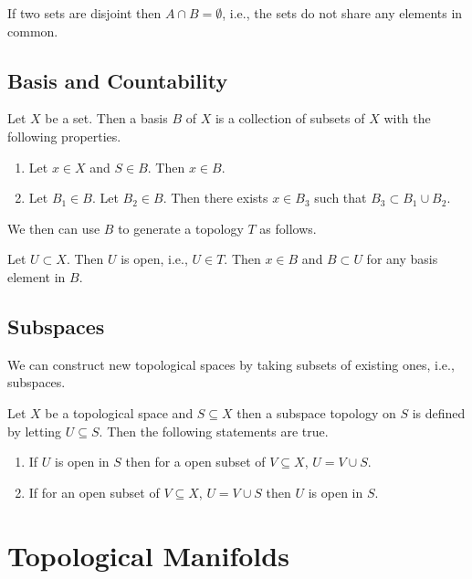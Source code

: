 \documentclass{article}
\begin{document}
If two sets are disjoint then $ A \cap B = \emptyset $, i.e., the sets do not share any elements in common.
\subsection{Basis and Countability}

Let $ X $ be a set. Then a basis $ B $ of $ X $ is a collection of subsets of $ X $ with the following
properties.

\begin{enumerate}
\item Let $ x \in X $ and $ S \in B $. Then $ x \in B $.
\item Let $ B_{1} \in B $. Let $ B_{2} \in B $. Then there exists  $ x \in B_{3} $ such that $ B_{3} \subset B_{1} \cup B_{2} $.
\end{enumerate}

We then can use $ B $ to generate a topology $ T $ as follows.

Let $ U \subset X $. Then $ U $ is open, i.e., $ U \in T $. Then  $ x \in B $ and $ B \subset U $ for any basis element in $ B $.

\subsection{Subspaces}

We can construct new topological spaces by taking subsets of existing ones, i.e., subspaces.

Let $ X $ be a topological space and $ S \subseteq X $ then a subspace topology on $ S $ is defined
by letting  $ U \subseteq  S $. Then the following statements are true.

\begin{enumerate}
\item If $ U $ is open in $ S $ then for a open subset of $ V \subseteq X $, $ U =  V \cup  S $.
\item If for an open subset of $ V \subseteq X $, $ U =  V \cup  S $ then  $ U $ is open in $ S $.
\end{enumerate}

\section{Topological Manifolds}
\end{document}
